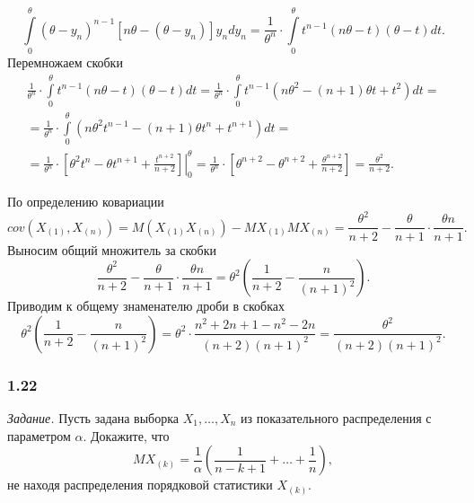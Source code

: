 \begin{enumerate}[label=\alph*)]
$$  \int \limits_0^{ \theta }
    \left( \theta - y_n \right)^{n - 1} \left[ n \theta - \left( \theta - y_n \right) \right] y_n
  dy_n =
  \frac{1}{ \theta^n} \cdot
  \int \limits_0^{ \theta } t^{n - 1} \left( n \theta - t \right) \left( \theta - t \right) dt.$$
Перемножаем скобки
\begin{equation*}
  \begin{split}
    \frac{1}{ \theta^n} \cdot
    \int \limits_0^{ \theta } t^{n - 1} \left( n \theta - t \right) \left( \theta - t \right) dt =
    \frac{1}{ \theta^n} \cdot
    \int \limits_0^{ \theta }
      t^{n - 1} \left( n \theta^2 - \left( n + 1 \right) \theta t + t^2 \right)
    dt = \\
    = \frac{1}{ \theta^n} \cdot
    \int \limits_0^{ \theta }
      \left( n \theta^2 t^{n - 1} - \left( n + 1 \right) \theta t^n + t^{n + 1} \right)
    dt = \\
    = \frac{1}{ \theta^n} \cdot
    \left.
      \left[ \theta^2 t^n - \theta t^{n + 1} + \frac{t^{n + 2}}{n + 2} \right]
    \right|_0^{ \theta } =
    \frac{1}{ \theta^n} \cdot
    \left[ \theta^{n + 2} - \theta^{n + 2} + \frac{ \theta^{n + 2}}{n + 2} \right] =
    \frac{ \theta^2}{n + 2}.
  \end{split}
\end{equation*}

По определению ковариации
$$cov \left( X_{ \left( 1 \right) }, X_{ \left( n \right) } \right) =
  M \left( X_{ \left( 1 \right) } X_{ \left( n \right) } \right) -
  MX_{ \left( 1 \right) } MX_{ \left( n \right) } =
  \frac{ \theta^2}{n + 2} - \frac{ \theta }{n + 1} \cdot \frac{ \theta n}{n + 1}.$$
Выносим общий множитель за скобки
$$ \frac{ \theta^2}{n + 2} - \frac{ \theta }{n + 1} \cdot \frac{ \theta n}{n + 1} =
  \theta^2 \left( \frac{1}{n + 2} - \frac{n}{ \left( n + 1 \right)^2} \right).$$
Приводим к общему знаменателю дроби в скобках
$$ \theta^2 \left( \frac{1}{n + 2} - \frac{n}{ \left( n + 1 \right)^2} \right) =
  \theta^2 \cdot \frac{n^2 + 2n + 1 - n^2 - 2n}{ \left( n + 2 \right) \left( n + 1 \right)^2} =
  \frac{ \theta^2}{ \left( n + 2 \right) \left( n + 1 \right)^2}.$$
\end{enumerate}

\subsubsection*{1.22}

\textit{Задание.}
Пусть задана выборка $X_1, \dotsc, X_n$ из показательного распределения с параметром $ \alpha $.
Докажите, что
$$MX_{ \left( k \right) } =
  \frac{1}{ \alpha } \left( \frac{1}{n - k + 1} + \dotsc + \frac{1}{n} \right),$$
не находя распределения порядковой статистики $X_{ \left( k \right) }$.

